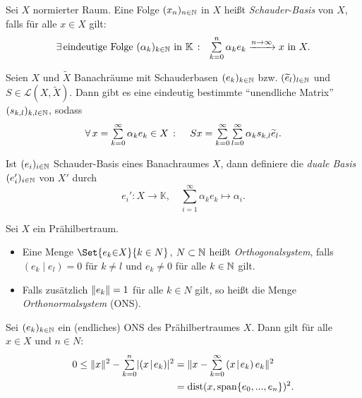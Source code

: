 \documentclass{cheat-sheet}
\newcommand{\K}{\mathbb{K}}
\newcommand{\LSO}{\mathcal{L}} %
\newcommand{\dist}{\mathrm{dist}} %
\newcommand{\scp}[2]{\left( #1 \!\mid\! #2 \right)} %
\newcommand{\convWith}[1]{\xrightarrow{#1 \to \infty}} %
\begin{document}

\begin{defn}
  Sei $X$ normierter Raum. Eine Folge $(x_n)_{n \in \mathbb{N}}$ in $X$ heißt \emph{Schauder-Basis} von $X$, falls für alle $x \in X$ gilt:
  \[
    \ex{\text{eindeutige Folge $(\alpha_k)_{k \in \N}$ in $\K$}} \enspace
    \sum_{k=0}^n \alpha_k e_k \convWith{n} x \text{ in } X.
  \]
\end{defn}

\begin{bem}
  Seien $X$ und $\widetilde{X}$ Banachräume mit Schauderbasen $(e_k)_{k \in \mathbb{N}}$ bzw. $(\widetilde{e}_l)_{l \in \mathbb{N}}$ und $S \in \LSO(X, \widetilde{X})$. Dann gibt es eine eindeutig bestimmte "`unendliche Matrix"' $(s_{k,l})_{k,l \in \mathbb{N}}$, sodass
  \[
    \fa{x = \sum_{k=0}^\infty \alpha_k e_k \in X}
    \quad
    Sx = \sum_{k=0}^\infty \sum_{l=0}^\infty \alpha_k s_{k,l} \widetilde{e}_l.
  \]
\end{bem}

\begin{defn}
  Ist $(e_i)_{i \in \mathbb{N}}$ Schauder-Basis eines Banachraumes $X$, dann definiere die \emph{duale Basis} $(e_i')_{i \in \mathbb{N}}$ von $X'$ durch
  \[ e_i' : X \to \K, \quad \sum_{i=1}^\infty \alpha_k e_k \mapsto \alpha_i. \]
\end{defn}


\begin{defn}
  Sei $X$ ein Prähilbertraum.
  \begin{itemize}
    \item Eine Menge $\Set{ e_k {\in} X }{ k \in N }$, $N \subset \mathbb{N}$ heißt \emph{Orthogonalsystem}, falls $\scp{e_k}{e_l} = 0$ für $k \not= l$ und $e_k \not= 0$ für alle $k \in \mathbb{N}$ gilt.
    \item Falls zusätzlich $\lVert e_k\rVert = 1$ für alle $k \in N$ gilt, so heißt die Menge \emph{Orthonormalsystem} (ONS).
  \end{itemize}
\end{defn}

\begin{lem}
  Sei $(e_k)_{k \in \mathbb{N}}$ ein (endliches) ONS des Prähilbertraumes $X$. Dann gilt für alle $x \in X$ und $n \in N$:
  \begin{align*}
    0 \leq \norm{x}^2 - \sum_{k=0}^n \abs{\scp{x}{e_k}}^2 &= \norm{x - \sum_{k=0}^\infty \scp{x}{e_k} e_k}^2\\
    &= \dist(x, \mathrm{span} \{ e_0, ..., e_n \})^2.
  \end{align*}
\end{lem}
\end{document}
